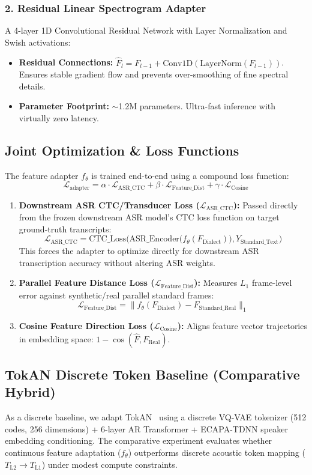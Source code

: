 \documentclass[11pt]{article}
\begin{document}
\subsubsection{2. Residual Linear Spectrogram Adapter}
A 4-layer 1D Convolutional Residual Network with Layer Normalization and Swish activations:
\begin{itemize}[leftmargin=*]
  \item \textbf{Residual Connections:} $\hat{F}_l = F_{l-1} + \text{Conv1D}(\text{LayerNorm}(F_{l-1}))$. Ensures stable gradient flow and prevents over-smoothing of fine spectral details.
  \item \textbf{Parameter Footprint:} $\sim$1.2M parameters. Ultra-fast inference with virtually zero latency.
\end{itemize}

\subsection{Joint Optimization \& Loss Functions}
The feature adapter $f_\theta$ is trained end-to-end using a compound loss function:
\[
\mathcal{L}_{\text{adapter}} = \alpha \cdot \mathcal{L}_{\text{ASR\_CTC}} + \beta \cdot \mathcal{L}_{\text{Feature\_Dist}} + \gamma \cdot \mathcal{L}_{\text{Cosine}}
\]
\begin{enumerate}[leftmargin=*]
  \item \textbf{Downstream ASR CTC/Transducer Loss ($\mathcal{L}_{\text{ASR\_CTC}}$):}
    Passed directly from the frozen downstream ASR model's CTC loss function on target ground-truth transcripts:
    \[
    \mathcal{L}_{\text{ASR\_CTC}} = \text{CTC\_Loss}\Big(\text{ASR\_Encoder}\big(f_\theta(F_{\text{Dialect}})\big), Y_{\text{Standard\_Text}}\Big)
    \]
    This forces the adapter to optimize directly for downstream ASR transcription accuracy without altering ASR weights.
  \item \textbf{Parallel Feature Distance Loss ($\mathcal{L}_{\text{Feature\_Dist}}$):}
    Measures $L_1$ frame-level error against synthetic/real parallel standard frames:
    \[
    \mathcal{L}_{\text{Feature\_Dist}} = \big\|f_\theta(F_{\text{Dialect}}) - F_{\text{Standard\_Real}}\big\|_1
    \]
  \item \textbf{Cosine Feature Direction Loss ($\mathcal{L}_{\text{Cosine}}$):}
    Aligns feature vector trajectories in embedding space: $1 - \cos(\hat{F}, F_{\text{Real}})$.
\end{enumerate}

\subsection{TokAN Discrete Token Baseline (Comparative Hybrid)}
As a discrete baseline, we adapt TokAN~\cite{tokan2025} using a discrete VQ-VAE tokenizer (512 codes, 256 dimensions) + 6-layer AR Transformer + ECAPA-TDNN speaker embedding conditioning. The comparative experiment evaluates whether continuous feature adaptation ($f_\theta$) outperforms discrete acoustic token mapping ($T_{\text{L2}} \to T_{\text{L1}}$) under modest compute constraints.
\end{document}
